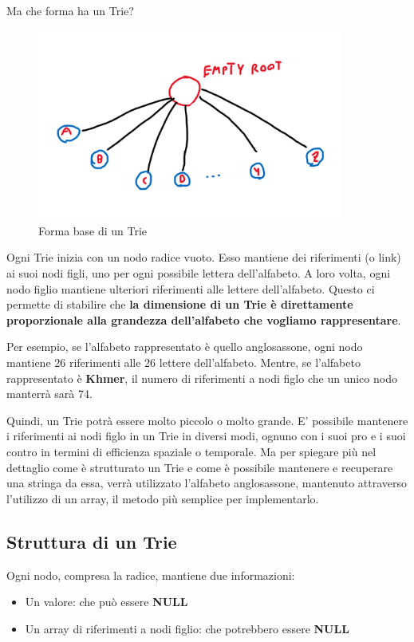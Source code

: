 \documentclass[a4paper, 12pt]{article}
\begin{document}
Ma che forma ha un Trie?

\clearpage
\begin{figure}[ht!]
    \centering
    \includegraphics[width=10cm]{Images/shape trie.png}
    \caption{Forma base di un Trie}
    \label{fig:my_label}
\end{figure}

Ogni Trie inizia con un nodo radice vuoto. Esso mantiene dei riferimenti (o link) ai suoi nodi figli, uno per ogni possibile lettera dell'alfabeto. A loro volta, ogni nodo figlio mantiene ulteriori riferimenti alle lettere dell'alfabeto. Questo ci permette di stabilire che \textbf{la dimensione di un Trie è direttamente proporzionale alla grandezza dell'alfabeto che vogliamo rappresentare}.

Per esempio, se l'alfabeto rappresentato è quello anglosassone, ogni nodo mantiene 26 riferimenti alle 26 lettere dell'alfabeto. Mentre, se l'alfabeto rappresentato è \textbf{Khmer}, il numero di riferimenti a nodi figlo che un unico nodo manterrà sarà 74.

Quindi, un Trie potrà essere molto piccolo o molto grande. E' possibile mantenere i riferimenti ai nodi figlo in un Trie in diversi modi, ognuno con i suoi pro e i suoi contro in termini di efficienza spaziale o temporale. Ma per spiegare più nel dettaglio come è strutturato un Trie e come è possibile mantenere e recuperare una stringa da essa, verrà utilizzato l'alfabeto anglosassone, mantenuto attraverso l'utilizzo di un array, il metodo più semplice per implementarlo.

\clearpage
\subsection{Struttura di un Trie}
Ogni nodo, compresa la radice, mantiene due informazioni:
\begin{itemize}
    \item Un valore: che può essere \textbf{NULL}
    \item Un array di riferimenti a nodi figlio: che potrebbero essere \textbf{NULL}
\end{itemize}
\end{document}
